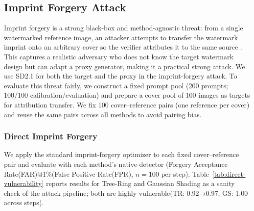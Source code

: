 \documentclass{article}
\theoremstyle{plain}
\theoremstyle{definition}
\theoremstyle{remark}
\begin{document}
\subsection{Imprint Forgery Attack}\label{sec:imprint-forgery}
Imprint forgery is a strong black-box and method-agnostic threat: from a
single watermarked reference image, an attacker attempts to transfer the watermark imprint onto an arbitrary cover so the verifier attributes it to the same source
\cite{muller2025blackbox}. This captures a realistic adversary who does not know the target watermark design but can adapt a proxy generator, making it a practical strong attack. We use SD2.1 for both the target and the proxy in the imprint-forgery attack. To evaluate this threat fairly, we construct a fixed prompt pool (200 prompts; 100/100 calibration/evaluation) and prepare a cover pool of 100 images as targets for attribution transfer. We fix 100 cover–reference pairs (one reference per cover) and reuse the same pairs across all methods to avoid pairing bias.

\subsubsection{Direct Imprint Forgery}
We apply the standard imprint-forgery optimizer to each fixed cover--reference pair and evaluate with each method’s native detector (Forgery Acceptance Rate(FAR)@1\%(False Positive Rate(FPR), $n=100$ per step).
Table~\ref{tab:direct-vulnerability} reports results for Tree-Ring and Gaussian Shading \cite{yang2024gaussianshading} as a sanity check of the attack pipeline; both are highly vulnerable(TR: 0.92→0.97, GS: 1.00 across steps).


\end{document}
